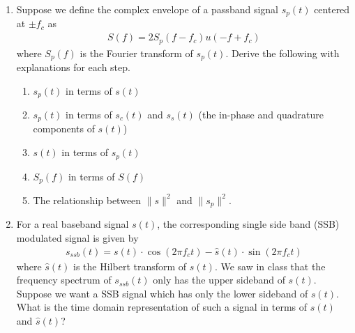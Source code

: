 \documentclass[10pt]{report}
\begin{document}
\begin{enumerate}
  \item Suppose we define the complex envelope of a passband signal $s_p(t)$ centered at $\pm f_c$ as  
    \begin{eqnarray*}
      S(f) = 2S_p(f - f_c)u(- f + f_c)
    \end{eqnarray*}
  where $S_p(f)$ is the Fourier transform of $s_p(t)$. Derive the following with explanations for each step.
    \begin{enumerate}
      \item $s_p(t)$ in terms of $s(t)$
      \item $s_p(t)$ in terms of $s_c(t)$ and $s_s(t)$ (the in-phase and quadrature components of $s(t)$)
      \item $s(t)$ in terms of $s_p(t)$
      \item $S_p(f)$ in terms of $S(f)$
      \item The relationship between $\lVert s \rVert^2$ and $\lVert s_p \rVert^2$.
    \end{enumerate}
  \item For a real baseband signal $s(t)$, the corresponding single side band (SSB) modulated signal is given by
    \begin{eqnarray*}
      s_{ssb}(t) = s(t) \cdot \cos (2\pi f_c t) - \hat{s}(t) \cdot \sin (2\pi f_c t)
    \end{eqnarray*}
  where $\hat{s}(t)$ is the Hilbert transform of $s(t)$.
    We saw in class that the frequency spectrum of $s_{ssb}(t)$ only has the upper sideband of $s(t)$. Suppose we want a SSB signal which has only the lower sideband of $s(t)$. What is the time domain representation of such a signal in terms of $s(t)$ and $\hat{s}(t)$?
\end{enumerate}
\end{document}
